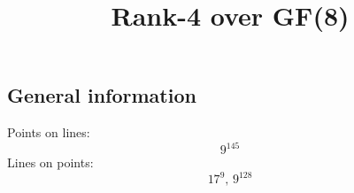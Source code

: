 \documentclass{article}
\newcommand\setTBstruts{\def\T{\rule{0pt}{2.6ex}}%
\def\B{\rule[-1.2ex]{0pt}{0pt}}}
\begin{document}
 
\setTBstruts



{\allowdisplaybreaks%






\title{Rank-4 over GF(8)}
\author{}%
\maketitle%
%
{}



\subsection*{General information}
Points on lines:
$$
9^{145}$$
Lines on points:
$$
17^9,\,9^{128}$$
}
\end{document}
